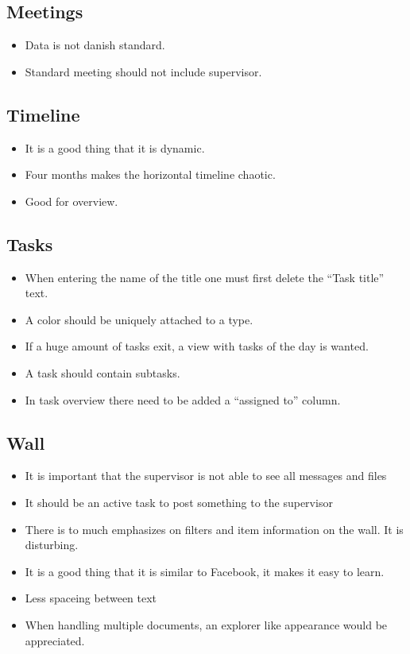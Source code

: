 \subsection*{Meetings}
\begin{itemize}
	\item Data is not danish standard.
	\item Standard meeting should not include supervisor.
\end{itemize}


\subsection*{Timeline}
\begin{itemize}
	\item It is a good thing that it is dynamic.
	\item Four months makes the horizontal timeline chaotic.
	\item Good for overview.
\end{itemize}


\subsection*{Tasks}
\begin{itemize}
	\item When entering the name of the title one must first delete the ``Task title'' text.
	\item A color should be uniquely attached to a type.
	\item If a huge amount of tasks exit, a view with tasks of the day is wanted.
	\item A task should contain subtasks.
	\item In task overview there need to be added a ``assigned to'' column.
\end{itemize}


\subsection*{Wall}
\begin{itemize}
	\item It is important that the supervisor is not able to see all messages and files
	\item It should be an active task to post something to the supervisor
	\item There is to much emphasizes on filters and item information on the wall. It is disturbing.
	\item It is a good thing that it is similar to Facebook, it makes it easy to learn.
	\item Less spaceing between text
	\item When handling multiple documents, an explorer like appearance would be appreciated.
\end{itemize}


